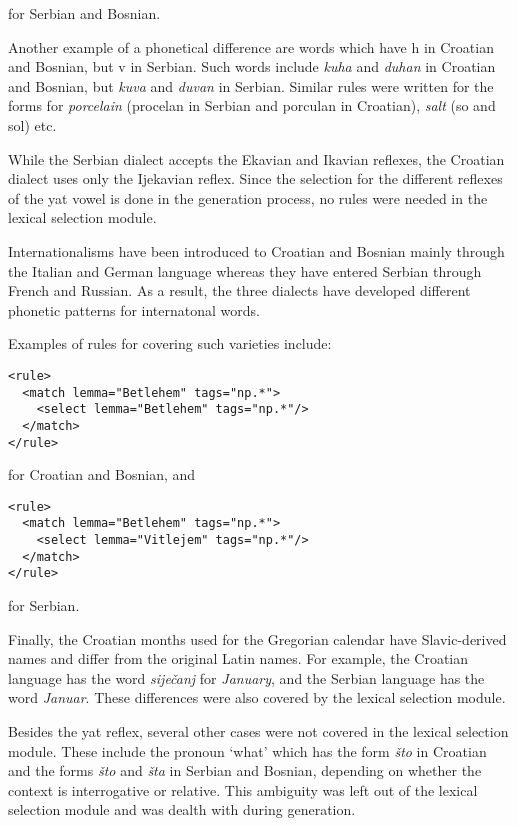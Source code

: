 for Serbian and Bosnian.

Another example of a phonetical difference are words which have h in Croatian and Bosnian, but v in Serbian.
Such words include \emph{kuha} and \emph{duhan} in Croatian and Bosnian, but \emph{kuva} and \emph{duvan} in Serbian.
Similar rules were written for the forms for \emph{porcelain} (procelan in Serbian and porculan in Croatian), 
\emph{salt} (so and sol) etc.

While the Serbian dialect accepts the Ekavian and Ikavian reflexes, 
the Croatian dialect uses only the Ijekavian reflex.
Since the selection for the different reflexes of the yat vowel is done in the generation process,
no rules were needed in the lexical selection module.

Internationalisms have been introduced to Croatian and Bosnian mainly through the Italian and German language
whereas they have entered Serbian through French and Russian. 
As a result, the three dialects have developed different phonetic patterns for internatonal words.

Examples of rules for covering such varieties include:
{\small
\begin{Verbatim}
<rule>
  <match lemma="Betlehem" tags="np.*">
    <select lemma="Betlehem" tags="np.*"/>
  </match>
</rule>
\end{Verbatim}
}
for Croatian and Bosnian, and
{\small
\begin{Verbatim}
<rule>
  <match lemma="Betlehem" tags="np.*">
    <select lemma="Vitlejem" tags="np.*"/>
  </match>
</rule>
\end{Verbatim}
}
for Serbian.

Finally, the Croatian months used for the Gregorian calendar have Slavic-derived names and differ from the original Latin names.
For example, the Croatian language has the word \emph{siječanj} for \emph{January}, and 
the Serbian language has the word \emph{Januar}.
These differences were also covered by the lexical selection module.

Besides the yat reflex, several other cases were not covered in the lexical selection module. These include the pronoun `what' which has the form \emph{što} in Croatian and the forms \emph{što} and \emph{šta} in Serbian and Bosnian, depending on whether the context is interrogative or relative. This ambiguity was left out of the lexical selection module and was dealth with during generation.


